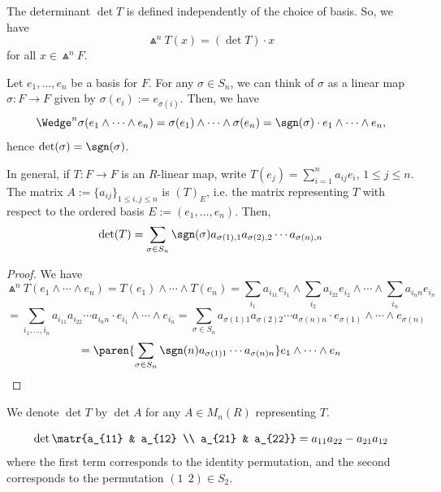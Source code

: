 \begin{notebox*}
    The determinant $\det T$ is defined independently of the choice of basis. So, we have
    $$\Wedge^nT(x) = (\det T)\cdot x$$
    for all $x \in \Wedge^nF$.
\end{notebox*}

\begin{ex}
    Let $e_1,\dots,e_n$ be a basis for $F$. For any $\sigma \in S_n$, we can think of $\sigma$ as a linear map $\sigma:F \to F$ given by $\sigma (e_i):=e_{\sigma (i)}$. Then, we have
    $$\Wedge^n\sigma (e_1\land \cdots \land e_n) = \sigma (e_1) \land \cdots \land \sigma (e_n)= \sgn (\sigma)\cdot e_1\land \cdots \land e_n,$$
    hence $\det (\sigma ) = \sgn (\sigma)$.
\end{ex}

\begin{prop}
    In general, if $T:F \to F$ is an $R$-linear map, write $T(e_j) = \sum_{i=1}^na_{ij}e_i$, $1 \leq j \leq n$. The matrix $A:= \{a_{ij}\}_{1 \leq i,j \leq n}$ is $(T)_E$, i.e. the matrix representing $T$ with respect to the ordered basis $E:=(e_1,\dots,e_n)$. Then,
    $$\det (T) = \sum_{\sigma \in S_n}\sgn(\sigma) a_{\sigma(1), 1}a_{\sigma(2), 2}\cdots a_{\sigma(n), n}$$
\end{prop}

\begin{proof}
    We have
    $$\Wedge^nT(e_1 \land \cdots \land e_n) = T(e_1) \land \cdots \land T(e_n) = \sum_{i_1}a_{i_11}e_{i_1}\land \sum_{i_2}a_{i_22}e_{i_2}\land \cdots \land \sum_{i_n}a_{i_nn}e_{i_n}$$
    $$= \sum_{i_1,\dots,i_n}a_{i_11}a_{i_22}\cdots a_{i_nn}\cdot e_{i_1}\land \cdots \land e_{i_n} = \sum_{\sigma \in S_n}a_{\sigma (1)1}a_{\sigma (2)2}\cdots a_{\sigma (n)n}\cdot e_{\sigma (1)}\land \cdots \land e_{\sigma (n)}$$
    $$= \paren{ \sum_{\sigma \in S_n}\sgn (n) a_{\sigma (1)1}\cdots a_{\sigma (n)n}}e_1 \land \cdots \land e_n$$
\end{proof}

\begin{rmk}
    We denote $\det T$ by $\det A$ for any $A \in M_n(R)$ representing $T$.
\end{rmk}

\begin{ex}
    $$\det \matr{a_{11} & a_{12} \\ a_{21} & a_{22}}=a_{11}a_{22}-a_{21}a_{12}$$
    where the first term corresponds to the identity permutation, and the second corresponds to the permutation $(1\:\:2) \in S_2$.
\end{ex}

